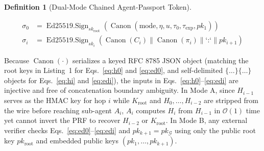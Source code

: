 \documentclass[conference,10pt]{IEEEtran}
\newtheorem{definition}{Definition}
\begin{document}
\begin{definition}[Dual-Mode Chained Agent-Passport Token]
\begin{itemize}
    {\scriptsize
    \begin{align}
    \sigma_0 &= \operatorname{Ed25519.Sign}_{sk_{\text{root}}}\!\left(\operatorname{Canon}(\text{mode},\eta,u,\tau_0,\tau_{\exp},pk_1)\right) \label{eq:ed0} \\
    \sigma_i &= \operatorname{Ed25519.Sign}_{sk_i}\!\left(\operatorname{Canon}(C_i) \parallel \operatorname{Canon}(\pi_i) \parallel \text{`:`} \parallel pk_{i+1}\right) \label{eq:edi}
    \end{align}}
\end{itemize}
\end{definition}

Because $\operatorname{Canon}(\cdot)$ serializes a keyed RFC 8785 JSON object (matching the root keys in Listing~1 for Eqs.~\eqref{eq:h0} and \eqref{eq:ed0}, and self-delimited $\{\dots\}\{\dots\}$ objects for Eqs.~\eqref{eq:hi} and \eqref{eq:edi}), the inputs in Eqs.~\eqref{eq:h0}--\eqref{eq:edi} are injective and free of concatenation boundary ambiguity. In Mode A, since $H_{i-1}$ serves as the HMAC key for hop $i$ while $K_{\text{root}}$ and $H_0, \dots, H_{i-2}$ are stripped from the wire before reaching sub-agent $A_i$, $A_i$ computes $H_i$ from $H_{i-1}$ in $\mathcal{O}(1)$ time yet cannot invert the PRF to recover $H_{i-2}$ or $K_{\text{root}}$. In Mode B, any external verifier checks Eqs.~\eqref{eq:ed0}--\eqref{eq:edi} and $pk_{k+1} = pk_{\mathcal{G}}$ using only the public root key $pk_{\text{root}}$ and embedded public keys $(pk_1, \dots, pk_{k+1})$.
\end{document}
